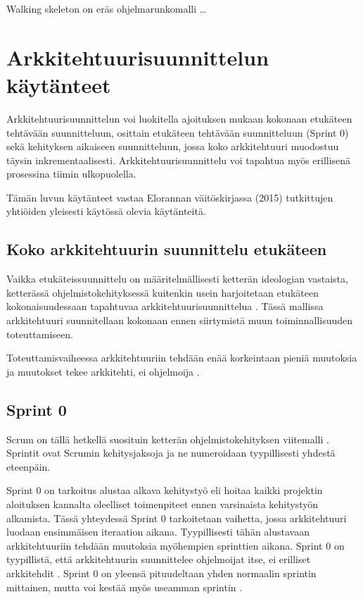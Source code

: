 Walking skeleton on eräs ohjelmarunkomalli \dots
\chapter{Arkkitehtuurisuunnittelun käytänteet}

Arkkitehtuurisuunnittelun voi luokitella ajoituksen mukaan kokonaan etukäteen tehtävään suunnitteluun, osittain etukäteen tehtävään suunnitteluun (Sprint 0) sekä kehityksen aikaiseen suunnitteluun, jossa koko arkkitehtuuri muodostuu täysin inkrementaalisesti. Arkkitehtuurisuunnittelu voi tapahtua myös erillisenä prosessina tiimin ulkopuolella.

Tämän luvun käytänteet vastaa Elorannan väitöskirjassa (2015) tutkittujen yhtiöiden yleisesti käytössä olevia käytänteitä.

\section{Koko arkkitehtuurin suunnittelu etukäteen}
Vaikka etukäteissuunnittelu on määritelmällisesti ketterän ideologian vastaista, ketterässä ohjelmistokehityksessä kuitenkin usein harjoitetaan etukäteen kokonaisuudessaan tapahtuvaa arkkitehtuurisuunnittelua \citep{rost_distilling_2015, eloranta2015techniques}. Tässä mallissa arkkitehtuuri suunnitellaan kokonaan ennen siirtymistä muun toiminnallisuuden toteuttamiseen. 

Toteuttamisvaiheessa arkkitehtuuriin tehdään enää korkeintaan pieniä muutoksia ja muutokset tekee arkkitehti, ei ohjelmoija \citep{eloranta2015techniques}.

\section{Sprint 0}

Scrum on tällä hetkellä suosituin ketterän ohjelmistokehityksen viitemalli \citep{noauthor_14th_2020}. Sprintit ovat Scrumin kehitysjaksoja ja ne numeroidaan tyypillisesti yhdestä eteenpäin.

Sprint 0 on tarkoitus alustaa alkava kehitystyö eli hoitaa kaikki projektin aloituksen kannalta oleelliset toimenpiteet ennen varsinaista kehitystyön alkamista. Tässä yhteydessä Sprint 0 tarkoitetaan vaihetta, jossa arkkitehtuuri luodaan ensimmäisen iteraation aikana. Tyypillisesti tähän alustavaan arkkitehtuuriin tehdään muutoksia myöhempien sprinttien aikana. Sprint 0 on tyypillistä, että arkkitehtuurin suunnittelee ohjelmoijat itse, ei erilliset arkkitehdit \citep{eloranta2015techniques}. Sprint 0 on yleensä pituudeltaan yhden normaalin sprintin mittainen, mutta voi kestää myös useamman sprintin \citep{prause_architectural_2012}.

